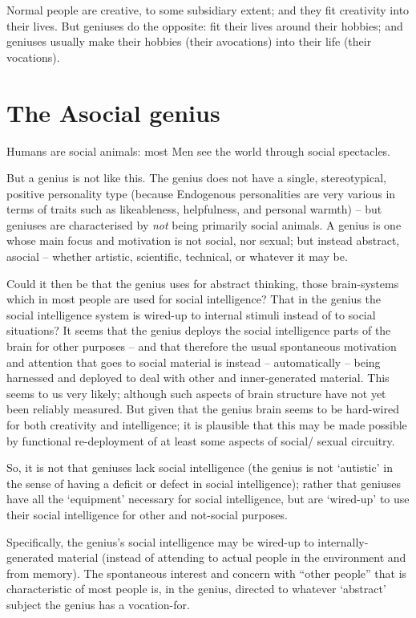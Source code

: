 \documentclass[
]{book}
\begin{document}
Normal people are creative, to some subsidiary extent; and they fit creativity into their lives. But geniuses do the opposite: fit their lives around their hobbies; and geniuses usually make their hobbies (their avocations) into their life (their vocations).

\hypertarget{the-asocial-genius}{%
\section{The Asocial genius}\label{the-asocial-genius}}

Humans are social animals: most Men see the world through social spectacles.

But a genius is not like this. The genius does not have a single, stereotypical, positive personality type (because Endogenous personalities are very various in terms of traits such as likeableness, helpfulness, and personal warmth) -- but geniuses are characterised by \emph{not} being primarily social animals. A genius is one whose main focus and motivation is not social, nor sexual; but instead abstract, asocial -- whether artistic, scientific, technical, or whatever it may be.

Could it then be that the genius uses for abstract thinking, those brain-systems which in most people are used for social intelligence? That in the genius the social intelligence system is wired-up to internal stimuli instead of to social situations? It seems that the genius deploys the social intelligence parts of the brain for other purposes -- and that therefore the usual spontaneous motivation and attention that goes to social material is instead -- automatically -- being harnessed and deployed to deal with other and inner-generated material. This seems to us very likely; although such aspects of brain structure have not yet been reliably measured. But given that the genius brain seems to be hard-wired for both creativity and intelligence; it is plausible that this may be made possible by functional re-deployment of at least some aspects of social/ sexual circuitry.

So, it is not that geniuses lack social intelligence (the genius is not `autistic' in the sense of having a deficit or defect in social intelligence); rather that geniuses have all the `equipment' necessary for social intelligence, but are `wired-up' to use their social intelligence for other and not-social purposes.

Specifically, the genius's social intelligence may be wired-up to internally-generated material (instead of attending to actual people in the environment and from memory). The spontaneous interest and concern with ``other people'' that is characteristic of most people is, in the genius, directed to whatever `abstract' subject the genius has a vocation-for.
\end{document}
